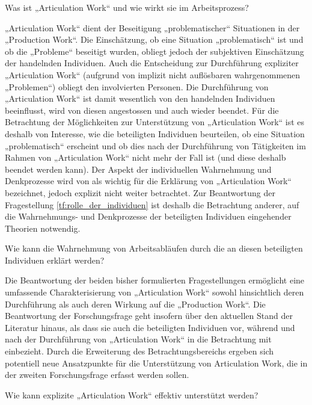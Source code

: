 \begin{tf}
	\label{tf:was_is_aw}
	Was ist „Articulation Work“ und wie wirkt sie im Arbeitsprozess?
\end{tf}

„Articulation Work“ dient der Beseitigung „problematischer“ Situationen in der „Production Work“. Die Einschätzung, ob eine Situation „problematisch“ ist und ob die „Probleme“ beseitigt wurden, obliegt jedoch der subjektiven Einschätzung der handelnden Individuen. Auch die Entscheidung zur Durchführung expliziter „Articulation Work“ (aufgrund von implizit nicht auflösbaren wahrgenommenen „Problemen“) obliegt den involvierten Personen. Die Durchführung von „Articulation Work“ ist damit wesentlich von den handelnden Individuen beeinflusst, wird von diesen angestossen und auch wieder beendet. Für die Betrachtung der Möglichkeiten zur Unterstützung von „Articulation Work“ ist es deshalb von Interesse, wie die beteiligten Individuen beurteilen, ob eine Situation „problematisch“ erscheint und ob dies nach der Durchführung von Tätigkeiten im Rahmen von „Articulation Work“ nicht mehr der Fall ist (und diese deshalb beendet werden kann). Der Aspekt der individuellen Wahrnehmung und Denkprozesse wird von \citet[][S. 131]{Strauss93} als wichtig für die Erklärung von „Articulation Work“ bezeichnet, jedoch explizit nicht weiter betrachtet. Zur Beantwortung der Fragestellung \ref{tf:rolle_der_individuen} ist deshalb die Betrachtung anderer, auf die Wahrnehmungs- und Denkprozesse der beteiligten Individuen eingehender Theorien notwendig.

\begin{tf}
	\label{tf:rolle_der_individuen}
	Wie kann die Wahrnehmung von Arbeitsabläufen durch die an diesen beteiligten Individuen erklärt werden?
\end{tf}

Die Beantwortung der beiden bisher formulierten Fragestellungen ermöglicht eine umfassende Charakterisierung von „Articulation Work“ sowohl hinsichtlich deren Durchführung als auch deren Wirkung auf die „Production Work“. Die Beantwortung der Forschungsfrage geht insofern über den aktuellen Stand der Literatur hinaus, als dass sie auch die beteiligten Individuen vor, während und nach der Durchführung von „Articulation Work“ in die Betrachtung mit einbezieht. Durch die Erweiterung des Betrachtungsbereichs ergeben sich potentiell neue Ansatzpunkte für die Unterstützung von Articulation Work, die in der zweiten Forschungsfrage erfasst werden sollen.

\begin{ff}
	\label{ff:umsetzung}
	Wie kann explizite „Articulation Work“ effektiv unterstützt werden?
\end{ff}

